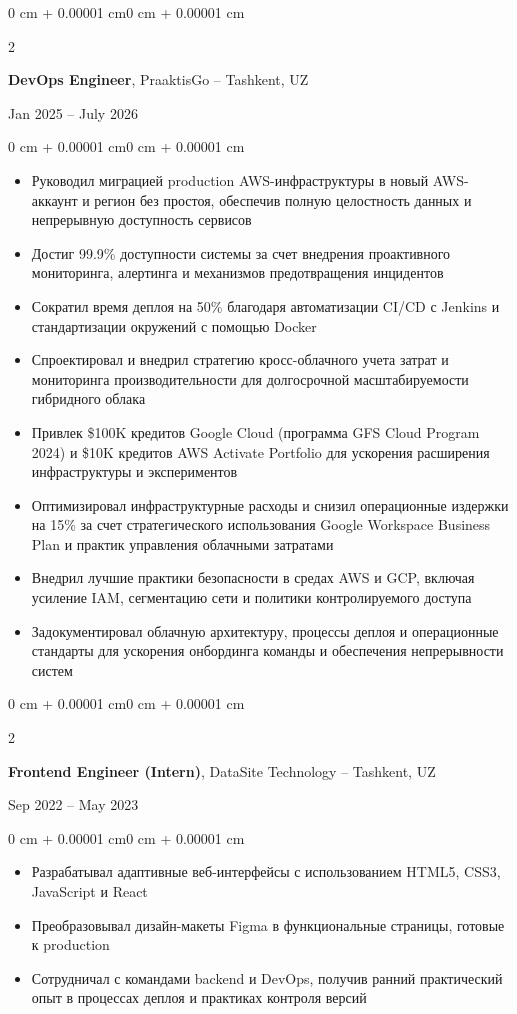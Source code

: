 \documentclass[10pt, letterpaper]{article}
\newenvironment{highlights}{
    \begin{itemize}[
        topsep=0.10 cm,
        parsep=0.10 cm,
        partopsep=0pt,
        itemsep=0pt,
        leftmargin=0 cm + 10pt
    ]
}{
    \end{itemize}
}
\newenvironment{onecolentry}{
    \begin{adjustwidth}{0 cm + 0.00001 cm}{0 cm + 0.00001 cm}
}{
    \end{adjustwidth}
}
\newenvironment{twocolentry}[2][]{
    \onecolentry
    \def\secondColumn{#2}
    \setcolumnwidth{\fill, 4.5 cm}
    \begin{paracol}{2}
}{
    \switchcolumn \raggedleft \secondColumn
    \end{paracol}
    \endonecolentry
}
\begin{document}
    \begin{twocolentry}{Jan 2025 -- July 2026}
        \textbf{DevOps Engineer}, PraaktisGo -- Tashkent, UZ
    \end{twocolentry}
    \vspace{0.10 cm}
    \begin{onecolentry}
        \begin{highlights}
        \item Руководил миграцией production AWS-инфраструктуры в новый AWS-аккаунт и регион без простоя, обеспечив полную целостность данных и непрерывную доступность сервисов
        \item Достиг 99.9\% доступности системы за счет внедрения проактивного мониторинга, алертинга и механизмов предотвращения инцидентов
        \item Сократил время деплоя на 50\% благодаря автоматизации CI/CD с Jenkins и стандартизации окружений с помощью Docker
        \item Спроектировал и внедрил стратегию кросс-облачного учета затрат и мониторинга производительности для долгосрочной масштабируемости гибридного облака
        \item Привлек \$100K кредитов Google Cloud (программа GFS Cloud Program 2024) и \$10K кредитов AWS Activate Portfolio для ускорения расширения инфраструктуры и экспериментов
        \item Оптимизировал инфраструктурные расходы и снизил операционные издержки на 15\% за счет стратегического использования Google Workspace Business Plan и практик управления облачными затратами
        \item Внедрил лучшие практики безопасности в средах AWS и GCP, включая усиление IAM, сегментацию сети и политики контролируемого доступа
        \item Задокументировал облачную архитектуру, процессы деплоя и операционные стандарты для ускорения онбординга команды и обеспечения непрерывности систем
\end{highlights}
\end{onecolentry}
    \vspace{0.20 cm}
    
    \begin{twocolentry}{Sep 2022 -- May 2023}
        \textbf{Frontend Engineer (Intern)}, DataSite Technology -- Tashkent, UZ
    \end{twocolentry}
    \vspace{0.10 cm}
    \begin{onecolentry}
        \begin{highlights}
            \item Разрабатывал адаптивные веб-интерфейсы с использованием HTML5, CSS3, JavaScript и React
            \item Преобразовывал дизайн-макеты Figma в функциональные страницы, готовые к production
            \item Сотрудничал с командами backend и DevOps, получив ранний практический опыт в процессах деплоя и практиках контроля версий
        \end{highlights}
    \end{onecolentry}
    \vspace{0.90 cm}
    
\end{document}

